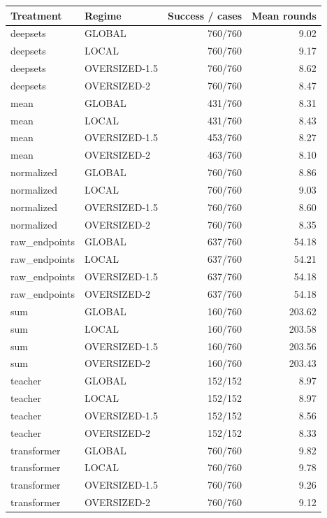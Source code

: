 \begin{tabular}{llrr}\toprule
Treatment & Regime & Success / cases & Mean rounds\\\midrule
deepsets & GLOBAL & 760/760 & 9.02\\
deepsets & LOCAL & 760/760 & 9.17\\
deepsets & OVERSIZED-1.5 & 760/760 & 8.62\\
deepsets & OVERSIZED-2 & 760/760 & 8.47\\
mean & GLOBAL & 431/760 & 8.31\\
mean & LOCAL & 431/760 & 8.43\\
mean & OVERSIZED-1.5 & 453/760 & 8.27\\
mean & OVERSIZED-2 & 463/760 & 8.10\\
normalized & GLOBAL & 760/760 & 8.86\\
normalized & LOCAL & 760/760 & 9.03\\
normalized & OVERSIZED-1.5 & 760/760 & 8.60\\
normalized & OVERSIZED-2 & 760/760 & 8.35\\
raw\_endpoints & GLOBAL & 637/760 & 54.18\\
raw\_endpoints & LOCAL & 637/760 & 54.21\\
raw\_endpoints & OVERSIZED-1.5 & 637/760 & 54.18\\
raw\_endpoints & OVERSIZED-2 & 637/760 & 54.18\\
sum & GLOBAL & 160/760 & 203.62\\
sum & LOCAL & 160/760 & 203.58\\
sum & OVERSIZED-1.5 & 160/760 & 203.56\\
sum & OVERSIZED-2 & 160/760 & 203.43\\
teacher & GLOBAL & 152/152 & 8.97\\
teacher & LOCAL & 152/152 & 8.97\\
teacher & OVERSIZED-1.5 & 152/152 & 8.56\\
teacher & OVERSIZED-2 & 152/152 & 8.33\\
transformer & GLOBAL & 760/760 & 9.82\\
transformer & LOCAL & 760/760 & 9.78\\
transformer & OVERSIZED-1.5 & 760/760 & 9.26\\
transformer & OVERSIZED-2 & 760/760 & 9.12\\
\bottomrule\end{tabular}
